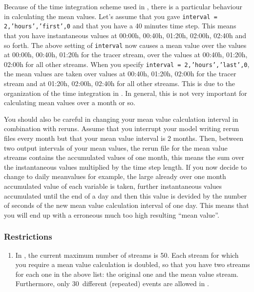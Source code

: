 \begin{appendix}
\begin{description}
\ditem[interval]


Because of the time integration scheme used in \echam,
there is a particular behaviour
in calculating the mean values. Let's assume that you gave 
\texttt{interval = 2,'hours','first',0} and that you have a 40 minutes
time step. 
This means that you have instantaneous 
values at 00:00h, 00:40h, 01:20h, 02:00h, 02:40h and
so forth.
The above setting of \texttt{interval} now causes a mean value over the values
at 00:00h, 00:40h, 01:20h for the tracer stream, over the values at 
00:40h, 01:20h, 02:00h for all other streams. When you specify 
\texttt{interval = 2,'hours','last',0}, the mean values are taken over values at
00:40h, 01:20h, 02:00h for the tracer stream and at 01:20h, 02:00h, 02:40h
for all other streams. This is due to the organization of the time integration
in \echam. In general, this is not very important for calculating mean values
over a month or so.

You should also be careful in changing your mean value calculation interval
in combination with reruns. Assume that you interrupt your model writing 
rerun files every month but that your mean value interval is 2 months. 
Then, between two output intervals of your mean values, the rerun file
for the mean value streams contains the accumulated values of one month,
this means the sum over the instantaneous values multiplied by the
time step length.
If you now decide to change to daily meanvalues for example, the large already
over one month accumulated value of each variable is taken, further 
instantaneous values accumulated until the end of a day and then this value
is devided by the number of seconds of the new mean value calculation interval
of one day. This means that you will end up with a erroneous much too high 
resulting ``mean value''.

\end{description}



\subsubsection{Restrictions}

\begin{enumerate}

\item In \echam, the current maximum number of streams is 50.
      Each stream for which you require a mean value calculation is doubled,
      so that you have two streams for each one in the above  list:
      the original one and the mean value stream. Furthermore, only
      30~different (repeated) events are allowed in \echam. 


\end{enumerate}
\end{appendix}

